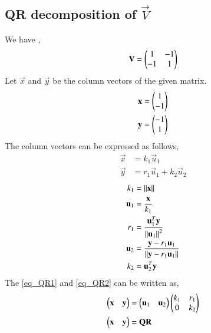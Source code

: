 \documentclass[journal,12pt,twocolumn]{IEEEtran}
\begin{document}
\subsection{QR decomposition of $\vec{V}$}
We have ,
\begin{equation}
\mathbf{V} = \begin{pmatrix}1 & -1\\ -1 & 1\end{pmatrix}
\end{equation}
Let $\vec{x}$ and $\vec{y}$ be the column vectors of the given matrix.
\begin{align}
\mathbf{x} &= \begin{pmatrix}1 \\-1 \end{pmatrix}\\
\mathbf{y} &= \begin{pmatrix}-1 \\ 1\end{pmatrix}
\end{align}
The column vectors can be expressed as follows,
\begin{align}
\vec{x} &= k_1\vec{u}_1\label{eq_QR1}\\
\vec{y} &= r_1\vec{u}_1+k_2\vec{u}_2\label{eq_QR2}
\end{align}
\begin{align}
k_1 &= \left\lVert\mathbf{x}\right\rVert\label{eq2.6}\\
\mathbf{u}_1 &= \frac{\mathbf{x}}{k_1} \label{eq2.7}\\
r_1 &= \frac{\mathbf{u}_1^T\mathbf{y}}{\left\lVert\mathbf{u}_1\right\rVert^2} \label{eq2.8} \\
\mathbf{u}_2 &= \frac{\mathbf{y} - r_1 \mathbf{u}_1}{\left\lVert\mathbf{y} - r_1 \mathbf{u}_1\right\rVert} \label{eq2.9}\\
k_2 &= {\mathbf{u}_2^T\mathbf{y}}\label{eq2.10}
\end{align}
The \eqref{eq_QR1} and \eqref{eq_QR2} can be written as, 
\begin{align}
\begin{pmatrix}\mathbf{x} & \mathbf{y}\end{pmatrix} &= \begin{pmatrix}\mathbf{u}_1 & \mathbf{u}_2\end{pmatrix}\begin{pmatrix}k_1 & r_1 \\ 0 & k_2\end{pmatrix}\label{QRMain}\\
\begin{pmatrix}\mathbf{x} & \mathbf{y}\end{pmatrix} &= \mathbf{Q}\mathbf{R}
\end{align}
\end{document}
